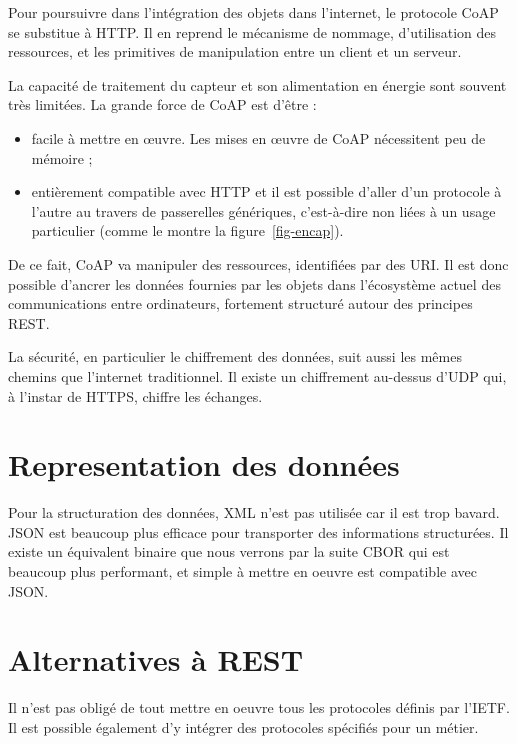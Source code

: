   
       \vspace{1em}

  Pour poursuivre dans l’intégration des objets dans l’internet, le protocole \ac{CoAP}  se substitue à \ac{HTTP}. Il en reprend le mécanisme de nommage, d’utilisation des ressources, et les primitives de manipulation entre un client et un serveur.

La capacité de traitement du capteur et son alimentation  en énergie sont souvent très limitées. 
La grande force de \ac{CoAP} est d’être :
\begin{itemize}
\item facile à mettre en œuvre. Les mises en œuvre de \ac{CoAP} nécessitent peu de mémoire ;
\item entièrement compatible avec 
\ac{HTTP} et il est possible d’aller d’un 
protocole à l’autre au travers de  passerelles génériques, c’est-à-dire non liées 
à un usage particulier (comme le montre la figure~\vref{fig-encap}).
\end{itemize}
De ce fait, \ac{CoAP} va manipuler des ressources, identifiées par des \ac{URI}. Il est donc possible d'ancrer les données fournies par les objets dans l'écosystème actuel des communications entre ordinateurs, fortement structuré autour des principes REST.

     \vspace{1em}

La sécurité, en particulier le chiffrement des données, suit aussi les mêmes chemins que l’internet traditionnel. 
Il existe un chiffrement au-dessus d’\ac{UDP} qui, à l’instar
de \ac{HTTPS}, 
chiffre les échanges.
  
\section{Representation des données}

Pour la structuration des données, \ac{XML} n'est pas utilisée car il est trop bavard. \ac{JSON} est beaucoup plus efficace pour transporter des informations structurées. Il existe un équivalent binaire que nous verrons par la suite \ac{CBOR} qui est beaucoup plus performant, et simple à mettre en oeuvre est compatible avec JSON.

\section {Alternatives à REST}


Il n'est pas obligé de tout mettre en oeuvre tous les protocoles définis par l'IETF. Il est possible également d'y intégrer des protocoles spécifiés pour un métier. 

